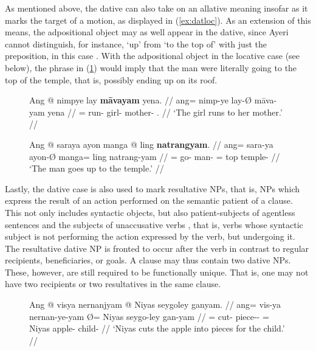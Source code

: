 As mentioned above, the dative can also take on an allative meaning insofar as
it marks the target of a motion, as displayed in (\ref{ex:datloc}). As an
extension of this means, the adpositional object may as well appear in the
dative, since Ayeri cannot distinguish, for instance, `up' from `to the top of'
with just the preposition, in this case . With the
adpositional object in the locative case (see below), the phrase in
(\ref{ex:datlocprep}) would imply that the man were literally going to the top
of the temple, that is, possibly ending up on its roof.

\begin{figure}[h]
\pex
\a\label{ex:datloc}\begingl
	\gla Ang @ nimpye lay \textbf{māvayam} yena. //
	\glb ang= nimp-ye lay-Ø māva-yam yena //
	\glc \AgtT{}= run-\TsgF{} girl-\Top{} mother-\Dat{} \TsgF{}.\Gen{} //
	\glft `The girl runs to her mother.' //
\endgl

\a\label{ex:datlocprep}\begingl
	\gla Ang @ saraya ayon manga @ ling \textbf{natrangyam}. //
	\glb ang= sara-ya ayon-Ø manga= ling natrang-yam //
	\glc \AgtT{}= go-\TsgM{} man-\Top{} \Dir{}= top temple-\Dat{} //
	\glft `The man goes up to the temple.' //
\endgl
\xe
\end{figure}

Lastly, the dative case is also used to mark resultative NPs, that is, NPs
which express the result of an action performed on the semantic patient of a
clause. This not only includes syntactic objects, but also patient-subjects of
agentless sentences and the subjects of unaccusative verbs
\citep{perlmutter1978}, that is, verbs whose syntactic subject is not
performing the action expressed by the verb, but undergoing it. The resultative
dative NP is fronted to occur after the verb in contrast to regular recipients,
beneficiaries, or goals. A clause may thus contain two dative NPs. These,
however, are still required to be functionally unique. That is, one may not
have two recipients or two resultatives in the same clause.

\begin{figure}[h]
\ex\label{ex:resultdat}\begingl
	\gla Ang @ visya nernanjyam {} @ Niyas seygoley ganyam. //
	\glb ang= vis-ya nernan-ye-yam Ø= Niyas seygo-ley gan-yam //
	\glc \AgtT{}= cut-\TsgM{} piece-\Pl{}-\Dat{} \Top{}= Niyas apple-\PargI{}
		child-\Dat{} //
	\glft `Niyas cuts the apple into pieces for the child.' //
\endgl\xe
\end{figure}

